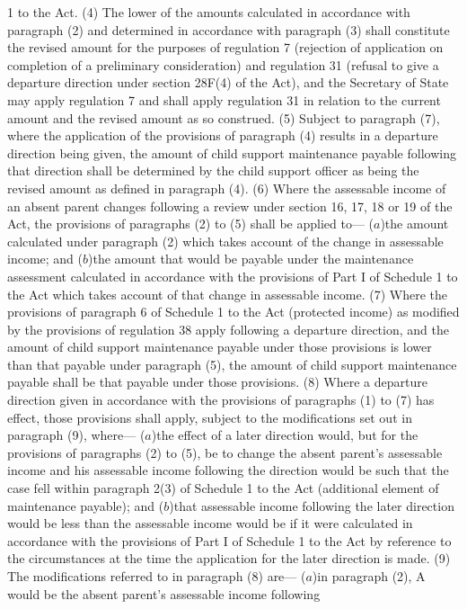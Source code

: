 \documentclass[a4paper]{article}
\begin{document}
1 to the Act.
(4) The lower of the amounts calculated in accordance with paragraph (2) and
determined in accordance with paragraph (3) shall constitute the revised amount
for the purposes of regulation 7 (rejection of application on completion of a
preliminary consideration) and regulation 31 (refusal to give a departure
direction under section 28F(4) of the Act), and the Secretary of State may apply
regulation 7 and shall apply regulation 31 in relation to the current amount and
the revised amount as so construed.
(5) Subject to paragraph (7), where the application of the provisions of
paragraph (4) results in a departure direction being given, the amount of child
support maintenance payable following that direction shall be determined by the
child support officer as being the revised amount as defined in paragraph (4).
(6) Where the assessable income of an absent parent changes following a review
under section 16, 17, 18 or 19 of the Act, the provisions of paragraphs (2) to
(5) shall be applied to—
($a$)the amount calculated under paragraph (2) which takes account of the change
in assessable income; and
($b$)the amount that would be payable under the maintenance assessment calculated
in accordance with the provisions of Part I of Schedule 1 to the Act which takes
account of that change in assessable income.
(7) Where the provisions of paragraph 6 of Schedule 1 to the Act (protected
income) as modified by the provisions of regulation 38 apply following a
departure direction, and the amount of child support maintenance payable under
those provisions is lower than that payable under paragraph (5), the amount of
child support maintenance payable shall be that payable under those provisions.
(8) Where a departure direction given in accordance with the provisions of
paragraphs (1) to (7) has effect, those provisions shall apply, subject to the
modifications set out in paragraph (9), where—
($a$)the effect of a later direction would, but for the provisions of paragraphs
(2) to (5), be to change the absent parent’s assessable income and his
assessable income following the direction would be such that the case fell
within paragraph 2(3) of Schedule 1 to the Act (additional element of
maintenance payable); and
($b$)that assessable income following the later direction would be less than the
assessable income would be if it were calculated in accordance with the
provisions of Part I of Schedule 1 to the Act by reference to the circumstances
at the time the application for the later direction is made.
(9) The modifications referred to in paragraph (8) are—
($a$)in paragraph (2), A would be the absent parent’s assessable income following
\end{document}
